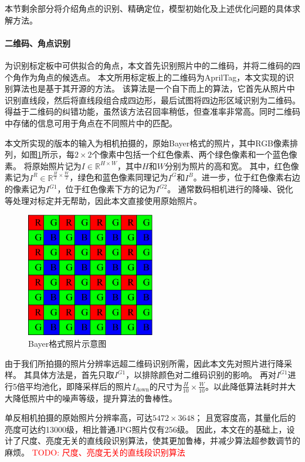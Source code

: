 \documentclass{scutmaster}
\newcommand{\TODO}[1]{\textcolor{red}{TODO: #1}}
\begin{document}
本节剩余部分将介绍角点的识别、精确定位，模型初始化及上述优化问题的具体求解方法。

\paragraph{二维码、角点识别}为识别标定板中可供拟合的角点，本文首先识别照片中的二维码，并将二维码的四个角作为角点的候选点。
本文所用标定板上的二维码为AprilTag，本文实现的识别算法也是基于其开源的方法\cite{AprilTag}。
该算法是一个自下而上的算法，它首先从照片中识别直线段，然后将直线段组合成四边形，最后试图将四边形区域识别为二维码。得益于二维码的纠错功能，虽然该方法召回率稍低，但查准率非常高。同时二维码中存储的信息可用于角点在不同照片中的匹配。

本文所实现的版本的输入为相机拍摄的，原始Bayer格式的照片，其中RGB像素排列，如图\ref{fig:bayer}所示，每$2\times 2$个像素中包括一个红色像素、两个绿色像素和一个蓝色像素。
将原始照片记为$I\in \mathbb{R}^{H\times W}$，其中$H$和$W$分别为照片的高和宽。
其中，红色像素记为$I^R\in \mathbb{R}^{\frac{H}{2}\times \frac{W}{2}}$，绿色和蓝色像素同理记为$I^G$和$I^B$。进一步，位于红色像素右边的像素记为$I^{G1}$，位于红色像素下方的记为$I^{G2}$。
通常数码相机进行的降噪、锐化等处理对标定并无帮助，因此本文直接使用原始照片。

\begin{figure}
    \centering
    \includegraphics[width=0.5\textwidth]{figures/bayer}
    \caption{Bayer格式照片示意图}
    \label{fig:bayer}
\end{figure}

由于我们所拍摄的照片分辨率远超二维码识别所需，因此本文先对照片进行降采样。
其具体方法是，首先只取$I^{G1}$，以排除颜色对二维码识别的影响。
再对$I^{G1}$进行5倍平均池化，即降采样后的照片$I_{\text{down}}$的尺寸为$\frac{H}{10}\times \frac{W}{10}$。以此降低算法耗时并大大降低照片中的噪声等级，提升算法的鲁棒性。

单反相机拍摄的原始照片分辨率高，可达$5472\times 3648$；
且宽容度高，其量化后的亮度可达约13000级，相比普通JPG照片仅有256级。
因此，本文在\cite{AprilTag}的基础上，设计了尺度、亮度无关的直线段识别算法，使其更加鲁棒，并减少算法超参数调节的麻烦。
\TODO{尺度、亮度无关的直线段识别算法}
\end{document}
